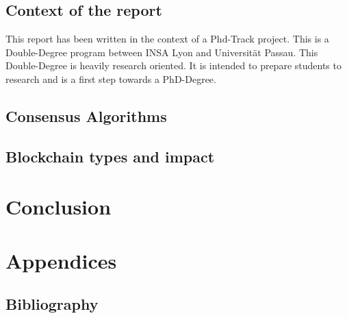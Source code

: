 \documentclass[12pt]{article} %
\begin{document}
\subsection{Context of the report}
This report has been written in the context of a Phd-Track project. This
is a Double-Degree program between INSA Lyon and Universität Passau. This 
Double-Degree is heavily research oriented. It is intended to prepare 
students to research and is a first step towards a PhD-Degree.

\subsection{Consensus Algorithms}

\subsection{Blockchain types and impact}

\section{}


\section{Conclusion}

\newpage
\section{Appendices}

\printglossary[type=\acronymtype]
\printglossary


\newpage


\subsection{Bibliography} %


\restoregeometry
\end{document}
